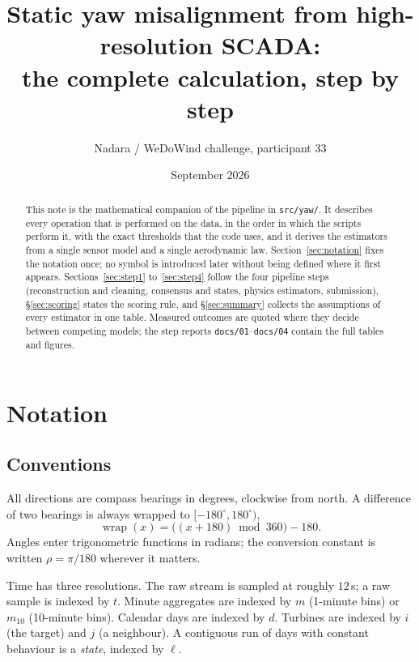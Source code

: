 \documentclass[11pt,a4paper]{article}
\title{Static yaw misalignment from high-resolution SCADA:\\
       the complete calculation, step by step}
\author{Nadara / WeDoWind challenge, participant 33}
\date{September 2026}
\theoremstyle{remark}
\newcommand{\wrap}{\operatorname{wrap}}
\newcommand{\dg}{^{\circ}}
\newcommand{\code}[1]{\texttt{#1}}
\begin{document}
\maketitle

\begin{abstract}
This note is the mathematical companion of the pipeline in \code{src/yaw/}. It
describes every operation that is performed on the data, in the order in which
the scripts perform it, with the exact thresholds that the code uses, and it
derives the estimators from a single sensor model and a single aerodynamic law.
Section~\ref{sec:notation} fixes the notation once; no symbol is introduced later
without being defined where it first appears. Sections~\ref{sec:step1}
to~\ref{sec:step4} follow the four pipeline steps (reconstruction and cleaning,
consensus and states, physics estimators, submission), \S\ref{sec:scoring}
states the scoring rule, and \S\ref{sec:summary} collects the assumptions of
every estimator in one table. Measured outcomes are quoted where they decide
between competing models; the step reports \code{docs/01}--\code{docs/04}
contain the full tables and figures.
\end{abstract}

\tableofcontents

\section{Notation}\label{sec:notation}

\subsection{Conventions}
All directions are compass bearings in degrees, clockwise from north. A difference
of two bearings is always wrapped to $[-180\dg,180\dg)$,
\begin{equation}
  \wrap(x) = \big((x+180) \bmod 360\big) - 180 .
  \label{eq:wrap}
\end{equation}
Angles enter trigonometric functions in radians; the conversion constant is
written $\rho = \pi/180$ wherever it matters.

Time has three resolutions. The raw stream is sampled at roughly $12$\,s; a raw
sample is indexed by $t$. Minute aggregates are indexed by $m$ (1-minute bins) or
$m_{10}$ (10-minute bins). Calendar days are indexed by $d$. Turbines are indexed
by $i$ (the target) and $j$ (a neighbour). A contiguous run of days with constant
behaviour is a \emph{state}, indexed by $\ell$.
\end{document}

